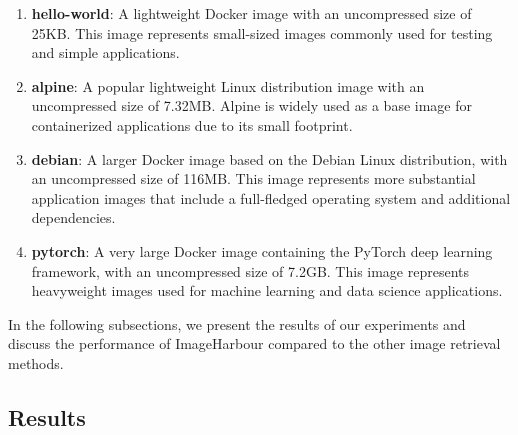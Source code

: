 \begin{enumerate}
    \itemsep0em
    \item \textbf{hello-world}: A lightweight Docker image with an uncompressed size of 25KB. This image represents small-sized images commonly used for testing and simple applications.
    \item \textbf{alpine}: A popular lightweight Linux distribution image with an uncompressed size of 7.32MB. Alpine is widely used as a base image for containerized applications due to its small footprint.
    \item \textbf{debian}: A larger Docker image based on the Debian Linux distribution, with an uncompressed size of 116MB. This image represents more substantial application images that include a full-fledged operating system and additional dependencies.
    \item \textbf{pytorch}: A very large Docker image containing the PyTorch deep learning framework, with an uncompressed size of 7.2GB. This image represents heavyweight images used for machine learning and data science applications.
\end{enumerate}

In the following subsections, we present the results of our experiments and discuss the performance of ImageHarbour compared to the other image retrieval methods.

\subsection{Results}

\begin{table}[h]
    \centering
    \caption{Image retrieval times (in milliseconds) for different images}
    \label{tab:image_retrieval_times}
\end{table}

